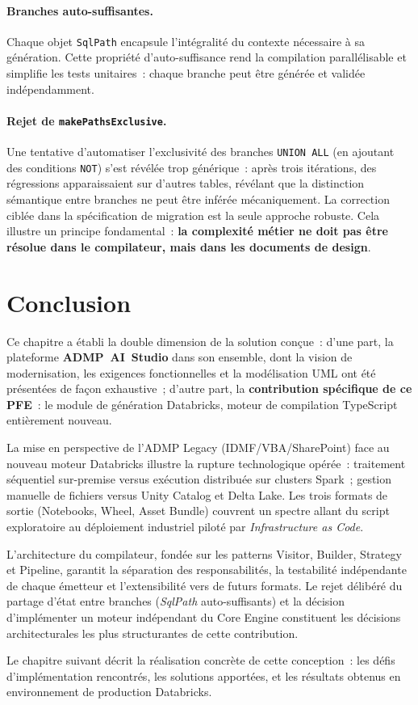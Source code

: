\paragraph{Branches auto-suffisantes.}
Chaque objet \texttt{SqlPath} encapsule l'intégralité du contexte nécessaire à sa génération. Cette propriété d'auto-suffisance rend la compilation parallélisable et simplifie les tests unitaires~: chaque branche peut être générée et validée indépendamment.

\paragraph{Rejet de \texttt{makePathsExclusive}.}
Une tentative d'automatiser l'exclusivité des branches \texttt{UNION ALL} (en ajoutant des conditions \texttt{NOT}) s'est révélée trop générique~: après trois itérations, des régressions apparaissaient sur d'autres tables, révélant que la distinction sémantique entre branches ne peut être inférée mécaniquement. La correction ciblée dans la spécification de migration est la seule approche robuste. Cela illustre un principe fondamental~: \textbf{la complexité métier ne doit pas être résolue dans le compilateur, mais dans les documents de design}.

\section*{Conclusion}

Ce chapitre a établi la double dimension de la solution conçue~: d'une part, la plateforme \textbf{ADMP~AI~Studio} dans son ensemble, dont la vision de modernisation, les exigences fonctionnelles et la modélisation UML ont été présentées de façon exhaustive~; d'autre part, la \textbf{contribution spécifique de ce PFE}~: le module de génération Databricks, moteur de compilation TypeScript entièrement nouveau.

La mise en perspective de l'ADMP Legacy (IDMF/VBA/SharePoint) face au nouveau moteur Databricks illustre la rupture technologique opérée~: traitement séquentiel sur-premise versus exécution distribuée sur clusters Spark~; gestion manuelle de fichiers versus Unity Catalog et Delta Lake. Les trois formats de sortie (Notebooks, Wheel, Asset Bundle) couvrent un spectre allant du script exploratoire au déploiement industriel piloté par \textit{Infrastructure as Code}.

L'architecture du compilateur, fondée sur les patterns Visitor, Builder, Strategy et Pipeline, garantit la séparation des responsabilités, la testabilité indépendante de chaque émetteur et l'extensibilité vers de futurs formats. Le rejet délibéré du partage d'état entre branches (\textit{SqlPath} auto-suffisants) et la décision d'implémenter un moteur indépendant du Core Engine constituent les décisions architecturales les plus structurantes de cette contribution.

Le chapitre suivant décrit la réalisation concrète de cette conception~: les défis d'implémentation rencontrés, les solutions apportées, et les résultats obtenus en environnement de production Databricks.
